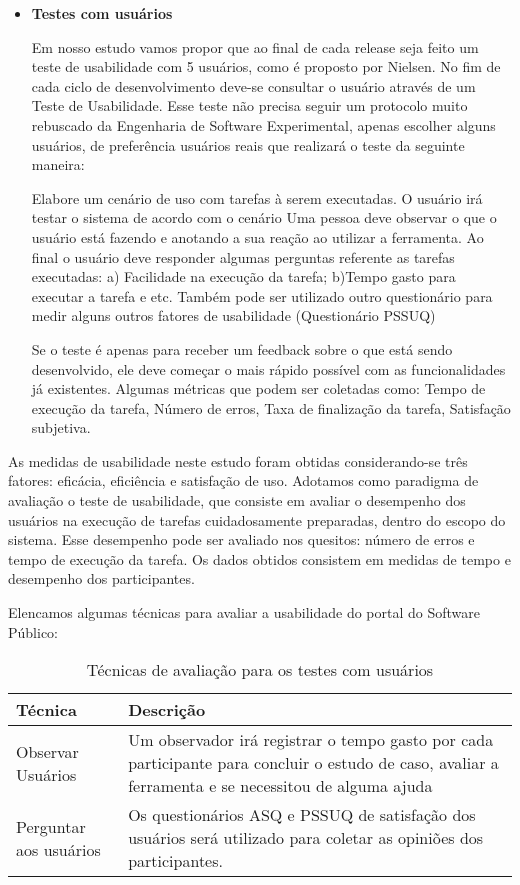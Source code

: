 \begin{enumerate}
\begin{itemize}
		\item \textbf{Testes com usuários}
		
		Em nosso estudo vamos propor que ao final de cada release seja feito um teste de usabilidade com 5 usuários, como é proposto por Nielsen. No fim de cada ciclo de desenvolvimento deve-se consultar o usuário através de um Teste de Usabilidade. Esse teste não precisa seguir um protocolo muito rebuscado da Engenharia de Software Experimental, apenas escolher alguns usuários, de preferência usuários reais que realizará o teste da seguinte maneira:

Elabore um cenário de uso com tarefas à serem executadas.
O usuário irá testar o sistema de acordo com o cenário
Uma pessoa deve observar o que o usuário está fazendo e anotando a sua reação ao utilizar a ferramenta.
Ao final o usuário deve responder algumas perguntas referente as tarefas executadas: a) Facilidade na execução da tarefa; b)Tempo gasto para executar a tarefa e etc.
Também pode ser utilizado outro questionário para medir alguns outros fatores de usabilidade (Questionário PSSUQ)
	
Se o teste é apenas para receber um feedback sobre o que está sendo desenvolvido, ele deve começar o mais rápido possível com as funcionalidades já existentes.
Algumas métricas que podem ser coletadas como: Tempo de execução da tarefa, Número de erros, Taxa de finalização da tarefa, Satisfação subjetiva. 

				
	\end{itemize} 
	
	As medidas de usabilidade neste estudo foram obtidas considerando-se três fatores: eficácia, eficiência e satisfação de uso.
%
Adotamos como paradigma de avaliação o teste de usabilidade, que consiste em avaliar o desempenho dos usuários na execução de tarefas cuidadosamente preparadas, dentro do escopo do sistema. Esse desempenho pode ser avaliado nos quesitos: número de erros e tempo de execução da tarefa. %
Os dados obtidos consistem em medidas de tempo e desempenho dos participantes.

Elencamos algumas técnicas para avaliar a usabilidade do portal do Software Público:

\begin{table}[h]
\begin{tabular}{|l| p{10cm} |}
\hline
Técnica & Descrição \\ \hline
Observar Usuários & Um observador irá registrar o tempo 
gasto por cada participante para concluir o estudo de caso, 
avaliar a ferramenta e se necessitou de alguma ajuda    \\ \hline
Perguntar aos usuários & Os questionários ASQ e PSSUQ 
de satisfação dos usuários será utilizado 
para coletar as opiniões dos participantes.\\ \hline
\end{tabular}
\caption{Técnicas de avaliação para os testes com usuários}
\end{table}
	

\end{enumerate}
